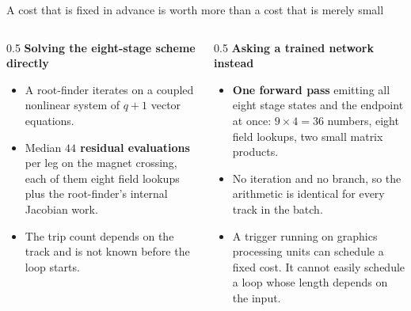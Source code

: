 \documentclass[aspectratio=169,10pt]{beamer}
\newcommand{\hl}[1]{{\color{accent}\textbf{#1}}}
\begin{document}
\begin{frame}[shrink=25]{A cost that is fixed in advance is worth more than a cost that is merely small}
  \vspace{2mm}
  \begin{columns}[T]
    \begin{column}{0.5\textwidth}
      \textbf{Solving the eight-stage scheme directly}
      \begin{itemize}
        \item A root-finder iterates on a coupled nonlinear system of $q+1$
              vector equations.
        \item Median \hl{$44$ residual evaluations} per leg on the magnet
              crossing, each of them eight field lookups plus the root-finder's
              internal Jacobian work.
        \item The trip count depends on the track and is not known before the
              loop starts.
      \end{itemize}
    \end{column}
    \begin{column}{0.5\textwidth}
      \textbf{Asking a trained network instead}
      \begin{itemize}
        \item \hl{One forward pass} emitting all eight stage states and the
              endpoint at once: $9 \times 4 = 36$ numbers, eight field lookups,
              two small matrix products.
        \item No iteration and no branch, so the arithmetic is identical for
              every track in the batch.
        \item A trigger running on graphics processing units can schedule a
              fixed cost. It cannot easily schedule a loop whose length depends
              on the input.
      \end{itemize}
    \end{column}
  \end{columns}
  \vspace{6mm}
  \begin{center}
  \end{center}
\end{frame}
\end{document}
